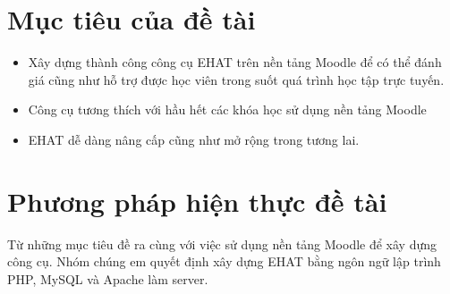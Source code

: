 \section{Mục tiêu của đề tài}
\begin{itemize}
	\item Xây dựng thành công công cụ EHAT trên nền tảng Moodle để có thể đánh giá cũng như hỗ trợ được học viên trong suốt quá trình học tập trực tuyến.
	\item Công cụ tương thích với hầu hết các khóa học sử dụng nền tảng Moodle
	\item EHAT dễ dàng nâng cấp cũng như mở rộng trong tương lai.
\end{itemize}

\section{Phương pháp hiện thực đề tài}
Từ những mục tiêu đề ra cùng với việc sử dụng nền tảng Moodle để xây dựng công cụ. Nhóm chúng em quyết định xây dựng EHAT bằng ngôn ngữ lập trình PHP, MySQL và Apache làm server.